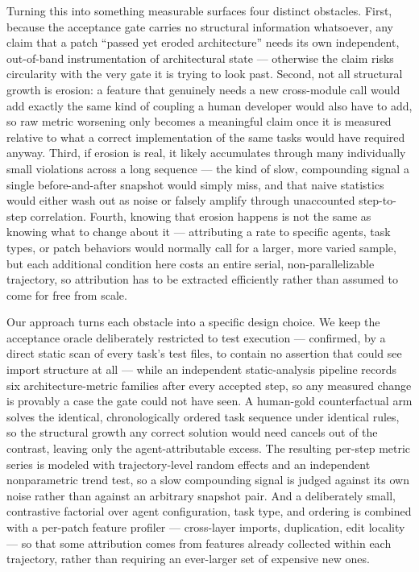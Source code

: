 \documentclass[11pt]{article}
\begin{document}
Turning this into something measurable surfaces four distinct obstacles. First, because the acceptance gate carries no structural information whatsoever, any claim that a patch ``passed yet eroded architecture'' needs its own independent, out-of-band instrumentation of architectural state --- otherwise the claim risks circularity with the very gate it is trying to look past. Second, not all structural growth is erosion: a feature that genuinely needs a new cross-module call would add exactly the same kind of coupling a human developer would also have to add, so raw metric worsening only becomes a meaningful claim once it is measured relative to what a correct implementation of the same tasks would have required anyway. Third, if erosion is real, it likely accumulates through many individually small violations across a long sequence --- the kind of slow, compounding signal a single before-and-after snapshot would simply miss, and that naive statistics would either wash out as noise or falsely amplify through unaccounted step-to-step correlation. Fourth, knowing that erosion happens is not the same as knowing what to change about it --- attributing a rate to specific agents, task types, or patch behaviors would normally call for a larger, more varied sample, but each additional condition here costs an entire serial, non-parallelizable trajectory, so attribution has to be extracted efficiently rather than assumed to come for free from scale.

Our approach turns each obstacle into a specific design choice. We keep the acceptance oracle deliberately restricted to test execution --- confirmed, by a direct static scan of every task's test files, to contain no assertion that could see import structure at all --- while an independent static-analysis pipeline records six architecture-metric families after every accepted step, so any measured change is provably a case the gate could not have seen. A human-gold counterfactual arm solves the identical, chronologically ordered task sequence under identical rules, so the structural growth any correct solution would need cancels out of the contrast, leaving only the agent-attributable excess. The resulting per-step metric series is modeled with trajectory-level random effects and an independent nonparametric trend test, so a slow compounding signal is judged against its own noise rather than against an arbitrary snapshot pair. And a deliberately small, contrastive factorial over agent configuration, task type, and ordering is combined with a per-patch feature profiler --- cross-layer imports, duplication, edit locality --- so that some attribution comes from features already collected within each trajectory, rather than requiring an ever-larger set of expensive new ones.
\end{document}
